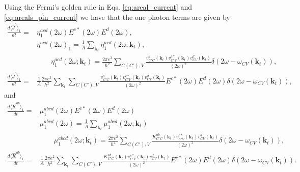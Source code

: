 \documentclass{article}
\begin{document}
Using the Fermi's golden rule in Eqs. \ref{eq:areal_current} and \ref{eq:areals_pin_current} we have that the one photon terms are given by
\begin{align*}
    \frac{d \langle \hat{J}^{a} \rangle_{1}}{dt} = & \eta_{1}^{acd}(2\omega) E^{c*}(2\omega) E^{d}(2\omega), \\
    & \eta^{acd}(2\omega)_{1} = \frac{1}{A} \sum_{\mathbf{k}_{t}} \eta_{1}^{acd}(2\omega;\mathbf{k}_{t}), \\
    & \qquad \eta_{1}^{acd}(2\omega;\mathbf{k}_{t}) = \frac{2\pi e^{3}}{\hbar^{2}} \sum_{C(C'),V}
    \frac{v^{a}_{C'C}(\mathbf{k}_{t})v^{c*}_{C'V}(\mathbf{k}_{t})v^{d}_{CV}(\mathbf{k}_{t})}{(2\omega)^{2}}
    \delta(2\omega-\omega_{CV}(\mathbf{k}_{t})), \\
    \frac{d \langle \hat{J}^{a} \rangle_{1}}{dt} = & \frac{1}{A}\frac{2\pi e^{3}}{\hbar^{2}} \sum_{\mathbf{k}_{t}} 
    \sum_{C(C'),V} \frac{v^{a}_{C'C}(\mathbf{k}_{t})v^{c*}_{C'V}(\mathbf{k}_{t})v^{d}_{CV}(\mathbf{k}_{t})}{(2\omega)^{2}}
    E^{c*}(2\omega) E^{d}(2\omega) \delta(2\omega-\omega_{CV}(\mathbf{k}_{t})),
\end{align*}
and
\begin{align*}
    \frac{d \langle \hat{K}^{ab}\rangle_{1}}{dt} = & \mu^{abcd}_{1}(2\omega)E^{c*}(2\omega)E^{d}(2\omega)\\
    & \mu^{abcd}_{1}(2\omega) = \frac{1}{A} \sum _{\mathbf{k}_{t}} \mu^{abcd}_{1}(2\omega;\mathbf{k}_{t}) \\
    & \qquad \mu^{abcd}_{1}(2\omega;\mathbf{k}_{t}) = \frac{2\pi e^{2}}{\hbar^{2}} \sum_{C(C'),V} \frac{K^{ab}_{C'C}(\mathbf{k}_{t}) v ^{c*}_{C'V}(\mathbf{k}_{t}) v^{d}_{CV}(\mathbf{k}_{t})}{(2\omega)^{2}} \delta(2\omega-\omega_{CV}(\mathbf{k}_{t})), \\
    \frac{d \langle \hat{K}^{ab}\rangle_{1}}{dt} = & \frac{1}{A} \frac{2\pi e^{2}}{\hbar^{2}} \sum _{\mathbf{k}_{t}}  \sum_{C(C'),V} \frac{K^{ab}_{C'C}(\mathbf{k}_{t}) v ^{c*}_{C'V}(\mathbf{k}_{t}) v^{d}_{CV}(\mathbf{k}_{t})}{(2\omega)^{2}} E^{c*}(2\omega)E^{d}(2\omega) \delta(2\omega-\omega_{CV}(\mathbf{k}_{t})) .
\end{align*}
\end{document}
